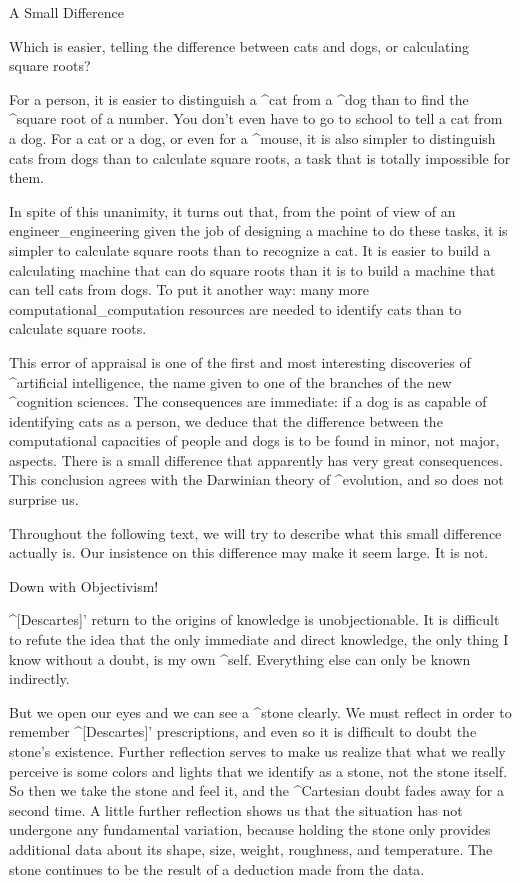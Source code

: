 \Section A Small Difference

Which is easier, telling the difference between cats and dogs, or
calculating square roots?

For a person, it is easier to distinguish a ^{cat} from a ^{dog} than to
find the ^{square root} of a number. You don't even have to go to school
to tell a cat from a dog. For a cat or a dog, or even for a ^{mouse}, it
is also simpler to distinguish cats from dogs than to calculate square
roots, a task that is totally impossible for them.

In spite of this unanimity, it turns out that, from the point of view of
an engineer_{engineering} given the job of designing a machine to do
these tasks, it is simpler to calculate square roots than to recognize a
cat. It is easier to build a calculating machine that can do square
roots than it is to build a machine that can tell cats from dogs. To put
it another way: many more computational_{computation} resources are
needed to identify cats than to calculate square roots.

This error of appraisal is one of the first and most interesting
discoveries of ^{artificial intelligence}, the name given to one of the
branches of the new ^{cognition} sciences. The consequences are
immediate: if a dog is as capable of identifying cats as a person, we
deduce that the difference between the computational capacities of
people and dogs is to be found in minor, not major, aspects. There is a
small difference that apparently has very great consequences. This
conclusion agrees with the Darwinian theory of ^{evolution}, and so does
not surprise us.

Throughout the following text, we will try to describe what this small
difference actually is. Our insistence on this difference may make it
seem large. It is not.


\Section Down with Objectivism!

^[Descartes]' return to the origins of knowledge is unobjectionable. It
is difficult to refute the idea that the only immediate and direct
knowledge, the only thing I know without a doubt, is my own ^{self}.
Everything else can only be known indirectly.

But we open our eyes and we can see a ^{stone} clearly. We must reflect
in order to remember ^[Descartes]' prescriptions, and even so it is
difficult to doubt the stone's existence. Further reflection serves to
make us realize that what we really perceive is some colors and lights
that we identify as a stone, not the stone itself. So then we take the
stone and feel it, and the ^{Cartesian doubt} fades away for a second
time. A little further reflection shows us that the situation has not
undergone any fundamental variation, because holding the stone only
provides additional data about its shape, size, weight, roughness, and
temperature. The stone continues to be the result of a deduction made
from the data.

